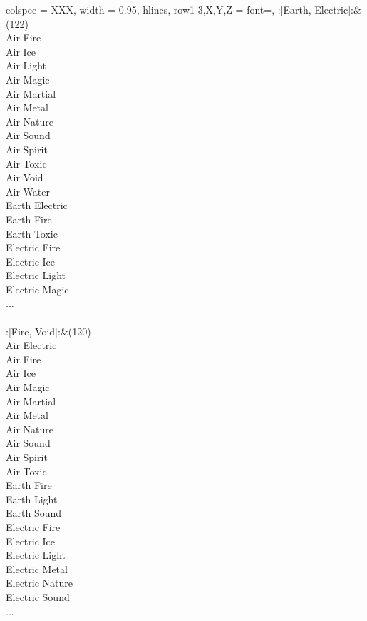 \begin{longtblr}[
	caption = {2v2 Attacking Effective},
	label = {2v2-Attacking-Effective},
]{
	colspec = {XXX}, width = 0.95\linewidth,
	hlines,
	row{1-3,X,Y,Z} = {font=\bfseries},
}
	:[Earth, Electric]:&{(122)\\
	Air Fire \\
	Air Ice \\
	Air Light \\
	Air Magic \\
	Air Martial \\
	Air Metal \\
	Air Nature \\
	Air Sound \\
	Air Spirit \\
	Air Toxic \\
	Air Void \\
	Air Water \\
	Earth Electric \\
	Earth Fire \\
	Earth Toxic \\
	Electric Fire \\
	Electric Ice \\
	Electric Light \\
	Electric Magic \\
	...\\
	}\\

	:[Fire, Void]:&{(120)\\
	Air Electric \\
	Air Fire \\
	Air Ice \\
	Air Magic \\
	Air Martial \\
	Air Metal \\
	Air Nature \\
	Air Sound \\
	Air Spirit \\
	Air Toxic \\
	Earth Fire \\
	Earth Light \\
	Earth Sound \\
	Electric Fire \\
	Electric Ice \\
	Electric Light \\
	Electric Metal \\
	Electric Nature \\
	Electric Sound \\
	...\\
	}\\


\end{longtblr}
